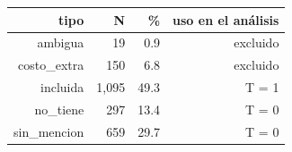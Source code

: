 \begin{tabular}{rrrr}
\toprule
tipo & N & \% & uso en el análisis \\
\midrule
ambigua & 19 & 0.9 & excluido \\
costo\_extra & 150 & 6.8 & excluido \\
incluida & 1,095 & 49.3 & T = 1 \\
no\_tiene & 297 & 13.4 & T = 0 \\
sin\_mencion & 659 & 29.7 & T = 0 \\
\bottomrule
\end{tabular}